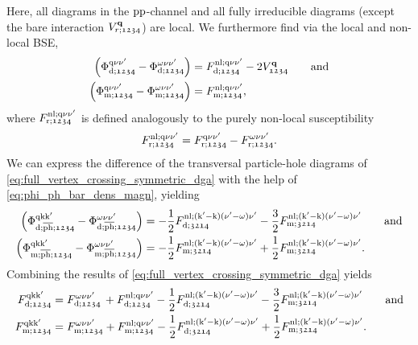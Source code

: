 \documentclass[../../main.tex]{subfiles}
\begin{document}
Here, all diagrams in the $\text{pp}$-channel and all fully irreducible diagrams (except the bare interaction $V^{\textbf{q}}_{r;\mathfrak{1234}}$) are local. We furthermore find via the local and non-local BSE,
\begin{subequations}
\begin{align}
	\left (\Phi^{\text{q}\nu\nu'}_{\text{d};\mathfrak{1234}}-\Phi^{\omega\nu\nu'}_{\text{d};\mathfrak{1234}}\right )&=F_{\text{d};\mathfrak{1234}}^{\text{nl};\text{q}\nu\nu'}-2 V^{\textbf{q}}_{\mathfrak{1234}}\qquad\text{and}\\
	\left (\Phi^{\text{q}\nu\nu'}_{\text{m};\mathfrak{1234}}-\Phi^{\omega\nu\nu'}_{\text{m};\mathfrak{1234}}\right )&=F_{\text{m};\mathfrak{1234}}^{\text{nl};\text{q}\nu\nu'},
\end{align}
\end{subequations}
where $F_{\text{r};\mathfrak{1234}}^{\text{nl};\text{q}\nu\nu'}$ is defined analogously to the purely non-local susceptibility 
\begin{align}
	F_{\text{r};\mathfrak{1234}}^{\text{nl};\text{q}\nu\nu'}=F_{\text{r};\mathfrak{1234}}^{\text{q}\nu\nu'}-F_{\text{r};\mathfrak{1234}}^{\omega\nu\nu'}.
\end{align}
We can express the difference of the transversal particle-hole diagrams of \eqref{eq:full_vertex_crossing_symmetric_dga} with the help of  \eqref{eq:phi_ph_bar_dens_magn}, yielding
\begin{subequations}
\begin{align}
	\left (\Phi^{\text{q}\text{k}\text{k}'}_{\text{d};\overline{\text{ph}};\mathfrak{1234}}-\Phi^{\omega\nu\nu'}_{\text{d};\overline{\text{ph}};\mathfrak{1234}}\right )&=-\frac12 F_{\text{d};\mathfrak{3214}}^{\text{nl};(\text{k}'-\text{k})(\nu'-\omega)\nu'}-\frac32 F_{\text{m};\mathfrak{3214}}^{\text{nl};(\text{k}'-\text{k})(\nu'-\omega)\nu'}\qquad\text{and}\\
	\left (\Phi^{\text{q}\text{k}\text{k}'}_{\text{m};\overline{\text{ph}};\mathfrak{1234}}-\Phi^{\omega\nu\nu'}_{\text{m};\overline{\text{ph}};\mathfrak{1234}}\right )&=-\frac12 F_{\text{m};\mathfrak{3214}}^{\text{nl};(\text{k}'-\text{k})(\nu'-\omega)\nu'}+\frac12 F_{\text{m};\mathfrak{3214}}^{\text{nl};(\text{k}'-\text{k})(\nu'-\omega)\nu'}.
\end{align}
\end{subequations}
Combining the results of \eqref{eq:full_vertex_crossing_symmetric_dga} yields
\begin{subequations}\label{eq:full_vertex_ladder_dga_crossing_symmetric}
\begin{align}
	F^{\text{q}\text{k}\text{k}'}_{\text{d};\mathfrak{1234}}&=F^{\omega\nu\nu'}_{\text{d};\mathfrak{1234}}\,+F^{\text{nl};\text{q}\nu\nu'}_{\text{d};\mathfrak{1234}}-\frac12 F_{\text{d};\mathfrak{3214}}^{\text{nl};(\text{k}'-\text{k})(\nu'-\omega)\nu'}-\frac32 F_{\text{m};\mathfrak{3214}}^{\text{nl};(\text{k}'-\text{k})(\nu'-\omega)\nu'}\qquad\text{and}\\
	F^{\text{q}\text{k}\text{k}'}_{\text{m};\mathfrak{1234}}&=F^{\omega\nu\nu'}_{\text{m};\mathfrak{1234}}+F^{\text{nl};\text{q}\nu\nu'}_{\text{m};\mathfrak{1234}}-\frac12 F_{\text{d};\mathfrak{3214}}^{\text{nl};(\text{k}'-\text{k})(\nu'-\omega)\nu'}+\frac12 F_{\text{m};\mathfrak{3214}}^{\text{nl};(\text{k}'-\text{k})(\nu'-\omega)\nu'}.
\end{align}
\end{subequations}
\end{document}
